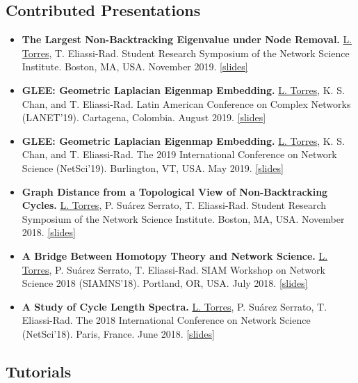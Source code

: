 \documentclass[12pt,]{scrartcl}
\newenvironment{myitemize}
{ \begin{itemize}
    \setlength{\itemsep}{5pt}
    \setlength{\parskip}{0pt}
    \setlength{\parsep}{0pt}     }
{ \end{itemize}                  }
\begin{document}
\subsection{Contributed Presentations}\label{contributed-presentations}

\begin{myitemize}
\leftskip-0.25in %

\item \textbf{The Largest Non-Backtracking Eigenvalue under Node Removal.} \underline{L. Torres}, T. Eliassi-Rad. Student Research Symposium of the Network Science Institute. Boston, MA, USA. November 2019. \href{http://leotrs.com/static/symposium2019.pdf}{[slides]}

\item \textbf{GLEE: Geometric Laplacian Eigenmap Embedding.} \underline{L. Torres}, K. S. Chan, and T. Eliassi-Rad. Latin American Conference on Complex Networks (LANET'19). Cartagena, Colombia. August 2019. \href{http://leotrs.com/static/GLEE_lanet19.pdf}{[slides]}

\item \textbf{GLEE: Geometric Laplacian Eigenmap Embedding.} \underline{L. Torres}, K. S. Chan, and T. Eliassi-Rad. The 2019 International Conference on Network Science (NetSci'19). Burlington, VT, USA. May 2019. \href{http://leotrs.com/static/GLEE_netsci19.pdf}{[slides]}

\item \textbf{Graph Distance from a Topological View of Non-Backtracking Cycles.} \underline{L. Torres}, P. Suárez Serrato, T. Eliassi-Rad. Student Research Symposium of the Network Science Institute. Boston, MA, USA. November 2018. \href{http://leotrs.com/static/netsci18.pdf}{[slides]}

\item \textbf{A Bridge Between Homotopy Theory and Network Science.} \underline{L. Torres}, P. Suárez Serrato, T. Eliassi-Rad. SIAM Workshop on Network Science 2018 (SIAMNS'18). Portland, OR, USA. July 2018. \href{http://leotrs.com/static/siamns18.pdf}{[slides]}

\item \textbf{A Study of Cycle Length Spectra.} \underline{L. Torres}, P. Suárez Serrato, T. Eliassi-Rad. The 2018 International Conference on Network Science (NetSci'18). Paris, France. June 2018. \href{http://leotrs.com/static/netsci18.pdf}{[slides]}

\end{myitemize}

\subsection{Tutorials}\label{tutorials}
\end{document}
